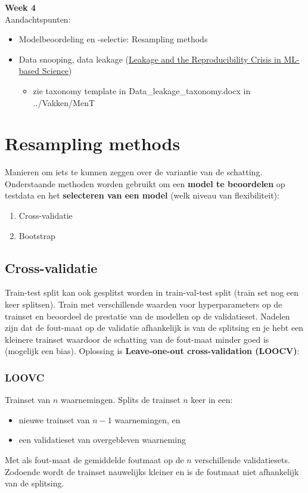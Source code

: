 {\large
\textbf{{\LARGE Week 4}}\\
Aandachtspunten:
\begin{itemize}
    \item Modelbeoordeling en -selectie: Resampling methods
    \item Data snooping, data leakage (\href{https://arxiv.org/pdf/2207.07048.pdf}{Leakage and the Reproducibility Crisis in ML-based Science})
    \begin{itemize}
        \item zie taxonomy template in Data\_leakage\_taxonomy.docx in ../Vakken/MenT
    \end{itemize}
\end{itemize}
\section{Resampling methods}
Manieren om iets te kunnen zeggen over de variantie van de schatting. Onderstaande methoden worden gebruikt om een \textbf{model te beoordelen} op testdata en het \textbf{selecteren van een model} (welk niveau van flexibiliteit):
\begin{enumerate}
    \item Cross-validatie
    \item Bootstrap
\end{enumerate}
\subsection{Cross-validatie}
Train-test split kan ook gesplitst worden in train-val-test split (train set nog een keer splitsen). Train met verschillende waarden voor hyperparameters op de trainset en beoordeel de prestatie van de modellen op de validatieset. Nadelen zijn dat de fout-maat op de validatie afhankelijk is van de splitsing en je hebt een kleinere trainset waardoor de schatting van de fout-maat minder goed is (mogelijk een bias). Oplossing is \textbf{Leave-one-out cross-validation (LOOCV)}:

\subsubsection{LOOVC}
\noindent Trainset van $n$ waarnemingen. Splits de trainset $n$ keer in een:
\begin{itemize}
    \item nieuwe trainset van $n-1$ waarnemingen, en
    \item een validatieset van overgebleven waarneming
\end{itemize}
Met als fout-maat de gemiddelde foutmaat op de $n$ verschillende validatiesets. Zodoende wordt de trainset nauwelijks kleiner en is de foutmaat niet afhankelijk van de splitsing.\\

}
